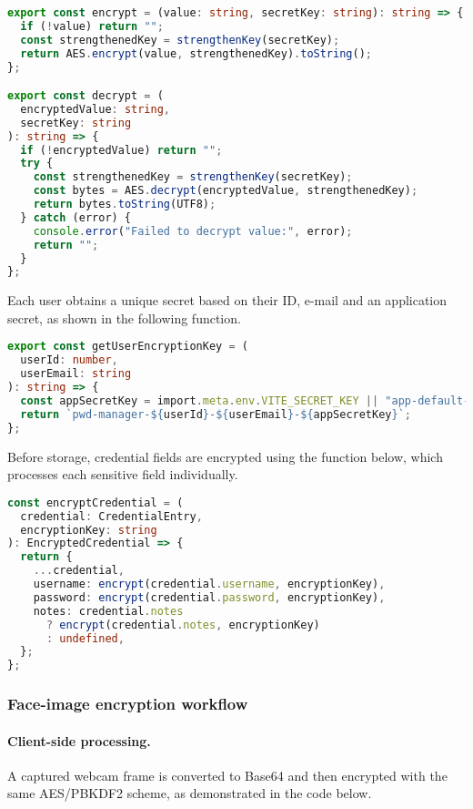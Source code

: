 \begin{lstlisting}[language=TypeScript, caption={AES-256 encryption and decryption functions}, label={lst:encrypt-decrypt}]
export const encrypt = (value: string, secretKey: string): string => {
  if (!value) return "";
  const strengthenedKey = strengthenKey(secretKey);
  return AES.encrypt(value, strengthenedKey).toString();
};

export const decrypt = (
  encryptedValue: string,
  secretKey: string
): string => {
  if (!encryptedValue) return "";
  try {
    const strengthenedKey = strengthenKey(secretKey);
    const bytes = AES.decrypt(encryptedValue, strengthenedKey);
    return bytes.toString(UTF8);
  } catch (error) {
    console.error("Failed to decrypt value:", error);
    return "";
  }
};
\end{lstlisting}

Each user obtains a unique secret based on their ID, e-mail and an application secret, as shown in the following function.

\begin{lstlisting}[language=TypeScript, caption={User-specific encryption key generation}, label={lst:user-key}]
export const getUserEncryptionKey = (
  userId: number,
  userEmail: string
): string => {
  const appSecretKey = import.meta.env.VITE_SECRET_KEY || "app-default-key";
  return `pwd-manager-${userId}-${userEmail}-${appSecretKey}`;
};
\end{lstlisting}

Before storage, credential fields are encrypted using the function below, which processes each sensitive field individually.

\begin{lstlisting}[language=TypeScript, caption={Encryption of credential fields before storage}, label={lst:encrypt-credential}]
const encryptCredential = (
  credential: CredentialEntry,
  encryptionKey: string
): EncryptedCredential => {
  return {
    ...credential,
    username: encrypt(credential.username, encryptionKey),
    password: encrypt(credential.password, encryptionKey),
    notes: credential.notes
      ? encrypt(credential.notes, encryptionKey)
      : undefined,
  };
};
\end{lstlisting}

\subsubsection{Face-image encryption workflow}

\paragraph{Client-side processing.}
A captured webcam frame is converted to Base64 and then encrypted with the same AES/PBKDF2 scheme, as demonstrated in the code below.

